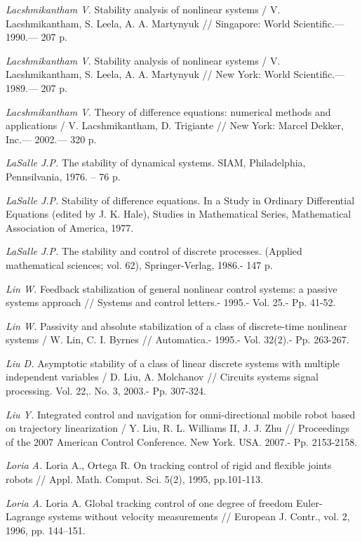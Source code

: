 \begin{thebibliography}{10}
	{\it Lacshmikantham V.} Stability analysis of nonlinear systems / V. Lacshmikantham, S. Leela, A. A. Martynyuk // Singapore: World Scientific.— 1990.— 207 p.
	
	{\it Lacshmikantham V.} Stability analysis of nonlinear systems / V. Lacshmikantham, S. Leela, A. A. Martynyuk // New York: World Scientific.— 1989.— 207 p.
	
	{\it Lacshmikantham V.} Theory of difference equations: numerical methods and applications / V. Lacshmikantham, D. Trigiante // New York: Marcel Dekker, Inc.— 2002.— 320 p.
	
	{\it LaSalle J.P.} The stability of dynamical systems. SIAM, Philadelphia, Pennsilvania, 1976. – 76 p.
	
	{\it LaSalle J.P.} Stability of difference equations. In a Study in Ordinary Differential Equations (edited by J. K. Hale), Studies in Mathematical Series, Mathematical Association of America, 1977.
	
	{\it LaSalle J.P.} The stability and control of discrete processes. (Applied mathematical sciences; vol. 62), Springer-Verlag, 1986.- 147 p.
	
	{\it Lin W.} Feedback stabilization of general nonlinear control systems: a passive systems approach // Systems and control letters.- 1995.- Vol. 25.- Pp. 41-52.
	
	{\it Lin W.} Passivity and absolute stabilization of a class of discrete-time nonlinear systems / W. Lin, C. I. Byrnes // Automatica.- 1995.- Vol. 32(2).- Pp. 263-267.
	
	{\it Liu D.} Asymptotic stability of a class of linear discrete systems with multiple independent variables / D. Liu, A. Molchanov // Circuits systems signal processing. Vol. 22,. No. 3, 2003.- Pp. 307-324.
	
	{\it Liu Y.} Integrated control and navigation for omni-directional mobile robot based on trajectory linearization / Y. Liu, R. L. Williams II, J. J. Zhu // Proceedings of the 2007 American Control Conference. New York. USA. 2007.- Pp. 2153-2158.
	
	{\it Loria A.} Loria A., Ortega R. On tracking control of rigid and flexible joints robots // Appl. Math. Comput. Sci. 5(2), 1995, pp.101-113.
	
	{\it Loria A.} Loria A. Global tracking control of one degree of freedom Euler-Lagrange systems without velocity measurements // European J. Contr., vol. 2, 1996, pp. 144–151.
	

\end{thebibliography}
